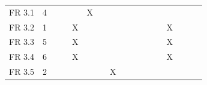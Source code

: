 \documentclass[a4paper,12pt]{article}
\begin{document}
\begin{table}[]
{\begin{tabular}{|l|c|c|c|c|c|c|c|c|c|c|c|c|c|c|c|c|}
FR 3.1 & 4                             &                             &                             &                             & X                           &                             &                             &                             &                             &                             &                             &                             &                             &                             &                             &                             \\
FR 3.2 & 1                             &                             &                             & X                           &                             &                             &                             &                             &                             &                             &                             &                             & X                           &                             &                             &                             \\
FR 3.3 & 5                             &                             &                             & X                           &                             &                             &                             &                             &                             &                             &                             &                             & X                           &                             &                             &                             \\
FR 3.4 & 6                             &                             &                             & X                           &                             &                             &                             &                             &                             &                             &                             &                             & X                           &                             &                             &                             \\
FR 3.5 & 2                             &                             &                             &                             &                             &                             & X                           &                             &                             &                             &                             &                             &                             &                             &                             &                             \\

\end{tabular}}
\end{table}
\end{document}
